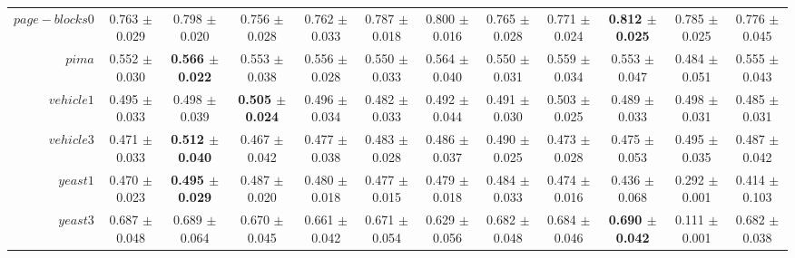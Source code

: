 \begin{table}[!ht]
{\begin{tabular}{r c c c c c c c c c c c}
$page-blocks0$ & 0.763 $\pm$ 0.029 & 0.798 $\pm$ 0.020 & 0.756 $\pm$ 0.028 & 0.762 $\pm$ 0.033 & 0.787 $\pm$ 0.018 & 0.800 $\pm$ 0.016 & 0.765 $\pm$ 0.028 & 0.771 $\pm$ 0.024 & \textbf{0.812 $\pm$ 0.025} & 0.785 $\pm$ 0.025 & 0.776 $\pm$ 0.045 \\
$pima$ & 0.552 $\pm$ 0.030 & \textbf{0.566 $\pm$ 0.022} & 0.553 $\pm$ 0.038 & 0.556 $\pm$ 0.028 & 0.550 $\pm$ 0.033 & 0.564 $\pm$ 0.040 & 0.550 $\pm$ 0.031 & 0.559 $\pm$ 0.034 & 0.553 $\pm$ 0.047 & 0.484 $\pm$ 0.051 & 0.555 $\pm$ 0.043 \\
$vehicle1$ & 0.495 $\pm$ 0.033 & 0.498 $\pm$ 0.039 & \textbf{0.505 $\pm$ 0.024} & 0.496 $\pm$ 0.034 & 0.482 $\pm$ 0.033 & 0.492 $\pm$ 0.044 & 0.491 $\pm$ 0.030 & 0.503 $\pm$ 0.025 & 0.489 $\pm$ 0.033 & 0.498 $\pm$ 0.031 & 0.485 $\pm$ 0.031 \\
$vehicle3$ & 0.471 $\pm$ 0.033 & \textbf{0.512 $\pm$ 0.040} & 0.467 $\pm$ 0.042 & 0.477 $\pm$ 0.038 & 0.483 $\pm$ 0.028 & 0.486 $\pm$ 0.037 & 0.490 $\pm$ 0.025 & 0.473 $\pm$ 0.028 & 0.475 $\pm$ 0.053 & 0.495 $\pm$ 0.035 & 0.487 $\pm$ 0.042 \\
$yeast1$ & 0.470 $\pm$ 0.023 & \textbf{0.495 $\pm$ 0.029} & 0.487 $\pm$ 0.020 & 0.480 $\pm$ 0.018 & 0.477 $\pm$ 0.015 & 0.479 $\pm$ 0.018 & 0.484 $\pm$ 0.033 & 0.474 $\pm$ 0.016 & 0.436 $\pm$ 0.068 & 0.292 $\pm$ 0.001 & 0.414 $\pm$ 0.103 \\
$yeast3$ & 0.687 $\pm$ 0.048 & 0.689 $\pm$ 0.064 & 0.670 $\pm$ 0.045 & 0.661 $\pm$ 0.042 & 0.671 $\pm$ 0.054 & 0.629 $\pm$ 0.056 & 0.682 $\pm$ 0.048 & 0.684 $\pm$ 0.046 & \textbf{0.690 $\pm$ 0.042} & 0.111 $\pm$ 0.001 & 0.682 $\pm$ 0.038 \\
\end{tabular}}
\end{table}
